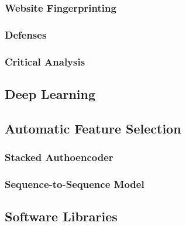 \subsubsection{Website Fingerprinting}

\subsubsection{Defenses}

\subsubsection{Critical Analysis}

\subsection{Deep Learning}

\subsection{Automatic Feature Selection}

\subsubsection{Stacked Authoencoder}

\subsubsection{Sequence-to-Sequence Model}

\subsection{Software Libraries}
